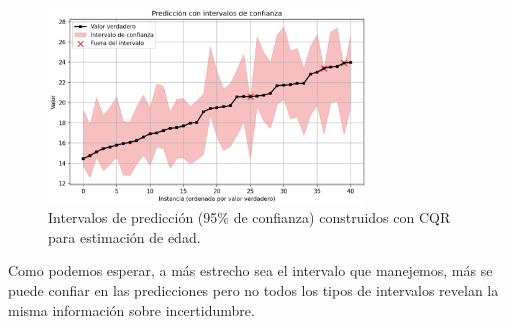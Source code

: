 \begin{itemize}
    \begin{figure}[htbp]
        \centering
        \includegraphics[width=0.75\textwidth]{apendices/imagenes/prediction_intervals.png}
        \caption[
            Intervalos de predicción (95\% de confianza) construidos con CQR para estimación de edad.
        ]{
            Intervalos de predicción (95\% de confianza) construidos con CQR para estimación de edad.
        } 
        \label{fig:prediction_intervals}
    \end{figure}

\end{itemize}




Como podemos esperar, a más estrecho sea el intervalo que manejemos, más se puede confiar en las predicciones pero no todos los tipos de intervalos revelan la misma información sobre incertidumbre. 
